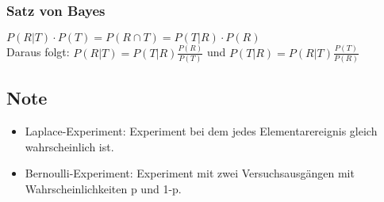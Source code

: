 \documentclass[margin=normal]{tex/hsrzf}
\begin{document}
\subsubsection*{Satz von Bayes}
$P(R|T) \cdot P(T) = P(R \cap T) = P(T|R) \cdot P(R)$
\\ Daraus folgt: $P(R|T) = P(T|R) \frac{P(R)}{P(T)}$ 
und $P(T|R) = P(R|T) \frac{P(T)}{P(R)}$ 
\subsection*{Note}
\begin{itemize}
    \item Laplace-Experiment: Experiment bei dem jedes Elementarereignis gleich wahrscheinlich ist.
    \item Bernoulli-Experiment: Experiment mit zwei Versuchsausgängen mit Wahrscheinlichkeiten p und 1-p.
\end{itemize}
\end{document}
